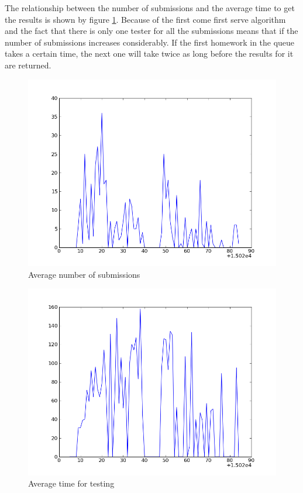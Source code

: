 The relationship between the number of submissions and the average time to
get the results is shown by figure \ref{fig:sub}. Because of the first come
first serve algorithm and the fact that there is only one tester for all
the submissions means that if the number of submissions increases
considerably. If the first homework in the queue takes a certain time, the
next one will take twice as long before the results for it are returned.

\begin{figure}[H]
\begin{center}
\includegraphics[height=0.4\textheight]{src/so}
\caption{Average number of submissions}
\label{fig:sub}
\end{center}
\end{figure}

\begin{figure}[H]
\begin{center}
\includegraphics[height=0.4\textheight]{src/sotime}
\caption{Average time for testing}
\label{fig:time}
\end{center}
\end{figure}

